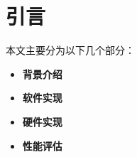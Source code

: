 
\chapter{引言}

本文主要分为以下几个部分：

\begin{itemize}
    \item \textbf{背景介绍}
    \item \textbf{软件实现}
    \item \textbf{硬件实现}
    \item \textbf{性能评估}
\end{itemize}